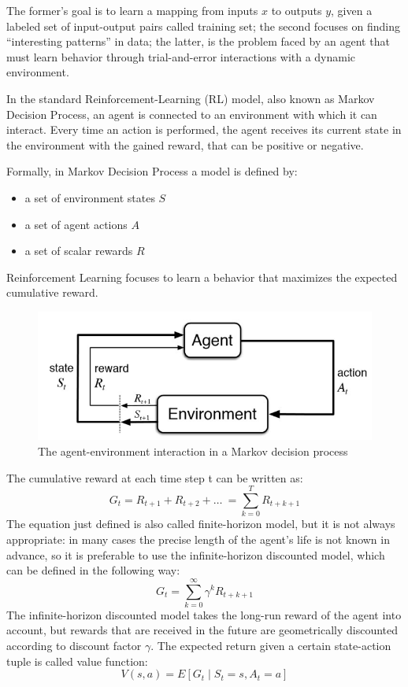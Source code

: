 \documentclass[Lau,oneside,noexaminfo]{sapthesis} %
\begin{document}
The former’s goal is to learn a mapping from inputs $x$ to outputs $y$, given a labeled set of input-output pairs called training set; the second focuses on finding “interesting patterns” in data; \cite{MURPHY} the latter, is the problem faced by an agent that must learn behavior through trial-and-error interactions with a dynamic environment. 

In the standard Reinforcement-Learning (RL) model, also known as Markov Decision Process, an agent is connected to an environment with which it can interact. Every time an action is performed, the agent receives its current state in the environment with the gained reward, that can be positive or negative. 

Formally, in Markov Decision Process a model is defined by:
\begin{itemize}
  \item a set of environment states $S$
  \item a set of agent actions $A$
  \item a set of scalar rewards $R$
\end{itemize}
Reinforcement Learning focuses to learn a behavior that maximizes the expected cumulative reward. \cite{RLSURVEY} 

\begin{figure}[H]
\caption{The agent-environment interaction in a Markov decision process \cite{SUTTONBARTO}}
\centering
\includegraphics[width=\textwidth]{markov}
\end{figure}
The cumulative reward at each time step  t can be written as:
\begin{equation}
G_t = R_{t+1} + R_{t+2} + \dots\ = \sum_{k=0}^{T}R_{t+k+1}
\end{equation}
The equation just defined is also called finite-horizon model, but it is not always appropriate: in many cases the precise length of the agent's life is not known in advance, so it is preferable to use the infinite-horizon discounted model, which can be defined in the following way:
\begin{equation}
G_t = \sum_{k=0}^{\infty}\gamma^k R_{t+k+1}
\end{equation}
The infinite-horizon discounted model takes the long-run reward of the agent into account, but rewards that are received in the future are geometrically discounted according to discount factor $\gamma$.
The expected return given a certain state-action tuple is called value function:
\begin{equation}
V(s,a) = E[G_t \mid S_t=s, A_t = a]
\end{equation}
\end{document}
